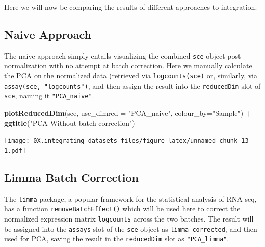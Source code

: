\documentclass[]{book}
\newenvironment{Shaded}{\begin{snugshade}}{\end{snugshade}}
\newcommand{\DataTypeTok}[1]{\textcolor[rgb]{0.13,0.29,0.53}{#1}}
\newcommand{\DecValTok}[1]{\textcolor[rgb]{0.00,0.00,0.81}{#1}}
\newcommand{\KeywordTok}[1]{\textcolor[rgb]{0.13,0.29,0.53}{\textbf{#1}}}
\newcommand{\NormalTok}[1]{#1}
\newcommand{\OperatorTok}[1]{\textcolor[rgb]{0.81,0.36,0.00}{\textbf{#1}}}
\newcommand{\StringTok}[1]{\textcolor[rgb]{0.31,0.60,0.02}{#1}}
\begin{document}
Here we will now be comparing the results of different approaches to integration.

\hypertarget{naive-approach}{%
\subsection{Naive Approach}\label{naive-approach}}

The naive approach simply entails visualizing the combined \texttt{sce} object post-normalization with no attempt at batch correction. Here we manually calculate the PCA on the normalized data (retrieved via \texttt{logcounts(sce)} or, similarly, via \texttt{assay(sce,\ "logcounts")}, and then assign the result into the \texttt{reducedDim} slot of \texttt{sce}, naming it \texttt{"PCA\_naive"}.

\begin{Shaded}
\end{Shaded}

\begin{Shaded}
\begin{Highlighting}[]
\KeywordTok{plotReducedDim}\NormalTok{(sce, }\DataTypeTok{use_dimred =} \StringTok{"PCA_naive"}\NormalTok{,}
               \DataTypeTok{colour_by=}\StringTok{"Sample"}\NormalTok{) }\OperatorTok{+}\StringTok{ }
\StringTok{    }\KeywordTok{ggtitle}\NormalTok{(}\StringTok{"PCA Without batch correction"}\NormalTok{)}
\end{Highlighting}
\end{Shaded}

\texttt{[image: 0X.integrating-datasets\_files/figure-latex/unnamed-chunk-13-1.pdf]}

\hypertarget{limma-batch-correction}{%
\subsection{Limma Batch Correction}\label{limma-batch-correction}}

The \texttt{limma} package, a popular framework for the statistical analysis of RNA-seq, has a function \texttt{removeBatchEffect()} which will be used here to correct the normalized expression matrix \texttt{logcounts} across the two batches. The result will be assigned into the \texttt{assays} slot of the \texttt{sce} object as \texttt{limma\_corrected}, and then used for PCA, saving the result in the \texttt{reducedDim} slot as \texttt{"PCA\_limma"}.
\end{document}

